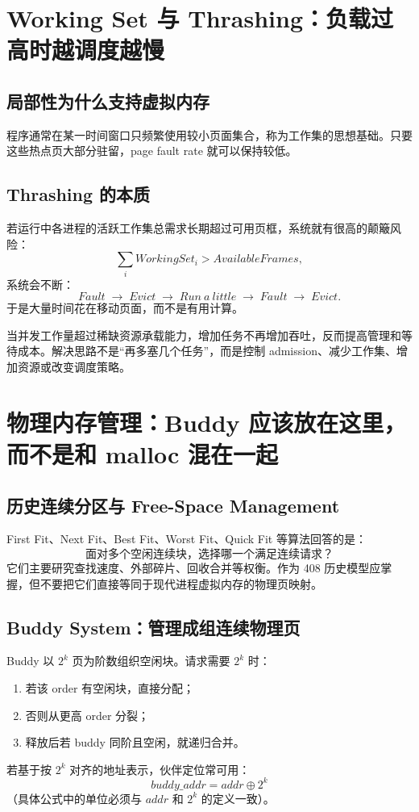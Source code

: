 \documentclass[11pt,a4paper]{ctexart}
\newcommand{\arr}{\;\longrightarrow\;}
\begin{document}
\section{Working Set 与 Thrashing：负载过高时越调度越慢}

\subsection{局部性为什么支持虚拟内存}
程序通常在某一时间窗口只频繁使用较小页面集合，称为工作集的思想基础。只要这些热点页大部分驻留，page fault rate 就可以保持较低。

\subsection{Thrashing 的本质}
若运行中各进程的活跃工作集总需求长期超过可用页框，系统就有很高的颠簸风险：
\[
\sum_i WorkingSet_i > AvailableFrames,
\]
系统会不断：
\[
Fault\arr Evict\arr Run\ a\ little\arr Fault\arr Evict.
\]
于是大量时间花在移动页面，而不是有用计算。

\begin{bridge}
当并发工作量超过稀缺资源承载能力，增加任务不再增加吞吐，反而提高管理和等待成本。解决思路不是“再多塞几个任务”，而是控制 admission、减少工作集、增加资源或改变调度策略。
\end{bridge}

\section{物理内存管理：Buddy 应该放在这里，而不是和 malloc 混在一起}

\subsection{历史连续分区与 Free-Space Management}
First Fit、Next Fit、Best Fit、Worst Fit、Quick Fit 等算法回答的是：
\[
\boxed{\text{面对多个空闲连续块，选择哪一个满足连续请求？}}
\]
它们主要研究查找速度、外部碎片、回收合并等权衡。作为 408 历史模型应掌握，但不要把它们直接等同于现代进程虚拟内存的物理页映射。

\subsection{Buddy System：管理成组连续物理页}
Buddy 以 $2^k$ 页为阶数组织空闲块。请求需要 $2^k$ 时：
\begin{enumerate}
  \item 若该 order 有空闲块，直接分配；
  \item 否则从更高 order 分裂；
  \item 释放后若 buddy 同阶且空闲，就递归合并。
\end{enumerate}
若基于按 $2^k$ 对齐的地址表示，伙伴定位常可用：
\[
\boxed{buddy\_addr = addr \oplus 2^k}
\]
（具体公式中的单位必须与 $addr$ 和 $2^k$ 的定义一致）。
\end{document}

